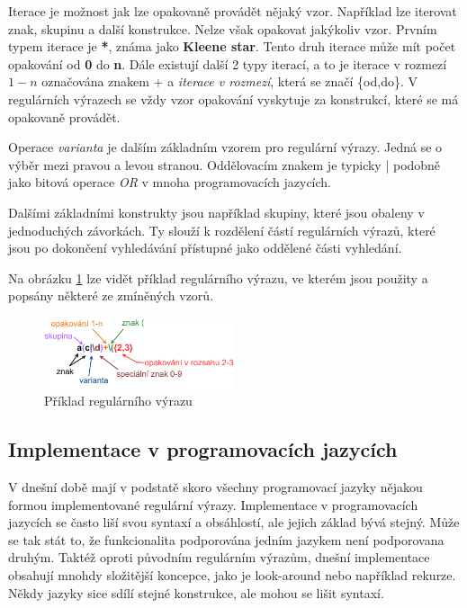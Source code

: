 Iterace je možnost jak lze opakovaně provádět nějaký vzor.
Například lze iterovat znak, skupinu a další konstrukce. 
Nelze však opakovat jakýkoliv vzor.
Prvním typem iterace je \textbf{*}, známa jako \textbf{Kleene star}.
Tento druh iterace může mít počet opakování od \textbf{0} do \textbf{n}. 
Dále existují další 2 typy iterací, a to je iterace v rozmezí $1-n$ označována znakem + a \textit{iterace v rozmezí}, která se značí \{od,do\}.
V regulárních výrazech se vždy vzor opakování vyskytuje za konstrukcí, které se má opakovaně provádět.

Operace \textit{varianta} je dalším základním vzorem pro regulární výrazy. 
Jedná se o výběr mezi pravou a levou stranou. 
Oddělovacím znakem je typicky | podobně jako bitová operace \textit{OR} v mnoha programovacích jazycích.

Dalšími základními konstrukty jsou například skupiny, které jsou obaleny v jednoduchých závorkách.
Ty slouží k rozdělení částí regulárních výrazů, které jsou po dokončení vyhledávání přístupné jako oddělené části vyhledání.

Na obrázku \ref{fig:REGEXEXMP} lze vidět příklad regulárního výrazu, ve kterém jsou použity a popsány některé ze zmíněných vzorů.

\begin{figure}[!h]
	\centering
	\includegraphics[width=0.5\textwidth]{Figures/regex_exmp.pdf}
	\caption{Příklad regulárního výrazu}
	\label{fig:REGEXEXMP}
\end{figure}

\subsection*{Implementace v programovacích jazycích}\label{sec:impipl}

V dnešní době mají v podstatě skoro všechny programovací jazyky nějakou formou implementované regulární výrazy.
Implementace v programovacích jazycích se často liší svou syntaxí a obsáhlostí, ale jejich základ bývá stejný.
Může se tak stát to, že funkcionalita podporována jedním jazykem není podporovana druhým.
Taktéž oproti původním regulárním výrazům, dnešní implementace obsahují mnohdy složitější koncepce, jako je look-around nebo například rekurze.
Někdy jazyky sice sdílí stejné konstrukce, ale mohou se lišit syntaxí.

